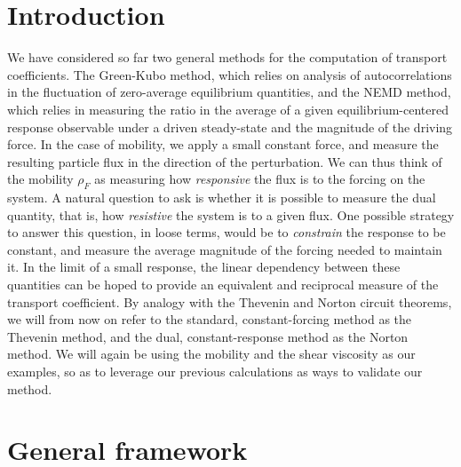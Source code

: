 \section{Introduction}
We have considered so far two general methods for the computation of transport coefficients. The Green-Kubo method, which relies on analysis of autocorrelations in the fluctuation of zero-average equilibrium quantities, 
and the NEMD method, which relies in measuring the ratio in the average of a given equilibrium-centered response observable under a driven steady-state and the magnitude of the driving force.
In the case of mobility, we apply a small constant force, and measure the resulting particle flux in the direction of the perturbation. We can thus think of the mobility $\rho_F$ as measuring how \textit{responsive} the flux is to the forcing on the system.
A natural question to ask is whether it is possible to measure the dual quantity, that is, how \textit{resistive} the system is to a given flux. One possible strategy to answer this question, in loose terms, would be to \textit{constrain} the response to be constant, and measure the average magnitude of the forcing needed to maintain it.
In the limit of a small response, the linear dependency between these quantities can be hoped to provide an equivalent and reciprocal measure of the transport coefficient. By analogy with the Thevenin and Norton circuit theorems, we will from now on refer to the standard, constant-forcing method as the Thevenin method,
and the dual, constant-response method as the Norton method. We will again be using the mobility and the shear viscosity as our examples, so as to leverage our previous calculations as ways to validate our method.


\section{General framework}

